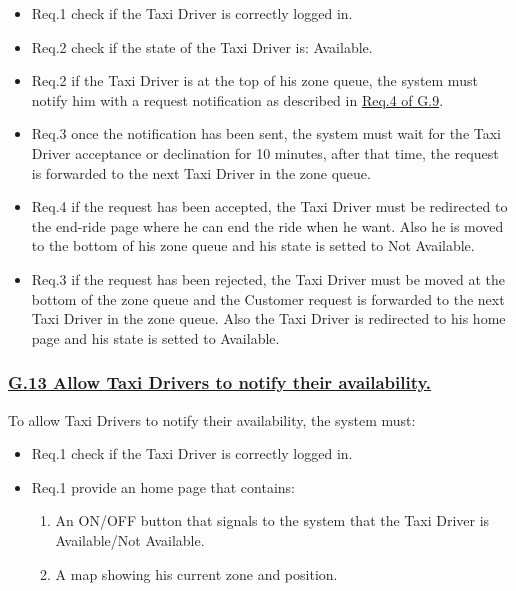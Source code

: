 \documentclass{report}
\begin{document}

				\begin{itemize}
					\item \lbrack Req.1\rbrack \label{sec:fr1_g12} check if the Taxi Driver is correctly logged in.
					\item \lbrack Req.2\rbrack \label{sec:fr2_g12} check if the state of the Taxi Driver is: Available.
					\item \lbrack Req.2\rbrack \label{sec:fr3_g12} if the Taxi Driver is at the top of his zone queue, the system must notify him with a request notification as described in \hyperref[sec:fr4_g9]{Req.4 of G.9}.
					\item \lbrack Req.3\rbrack \label{sec:fr4_g12} once the notification has been sent, the system must wait for the Taxi Driver acceptance or declination for 10 minutes, after that time, the request is forwarded to the next Taxi Driver in the zone queue.
					\item \lbrack Req.4\rbrack \label{sec:fr5_g12} if the request has been accepted, the Taxi Driver must be redirected to the end-ride page where he can end the ride when he want. Also he is moved to the bottom of his zone queue and his state is setted to Not Available.
					\item \lbrack Req.3\rbrack \label{sec:fr6_g12} if the request has been rejected, the Taxi Driver must be moved at the bottom of the zone queue and the Customer request is forwarded to the next Taxi Driver in the zone queue. Also the Taxi Driver is redirected to his home page and his state is setted to Available.
				\end{itemize}


			\subsubsection{\lbrack \hyperref[sec:g13]{G.13 Allow Taxi Drivers to notify their availability.}\rbrack}\label{sec:frs13}
			To allow Taxi Drivers to notify their availability, the system must:
				\begin{itemize}
					\item \lbrack Req.1\rbrack \label{sec:fr1_g13} check if the Taxi Driver is correctly logged in.
					\item \lbrack Req.1\rbrack \label{sec:fr1_g13} provide an home page that contains:
						\begin{enumerate}
							\item An ON/OFF button that signals to the system that the Taxi Driver is Available/Not Available.
							\item A map showing his current zone and position.
						\end{enumerate}
				\end{itemize}
\end{document}
